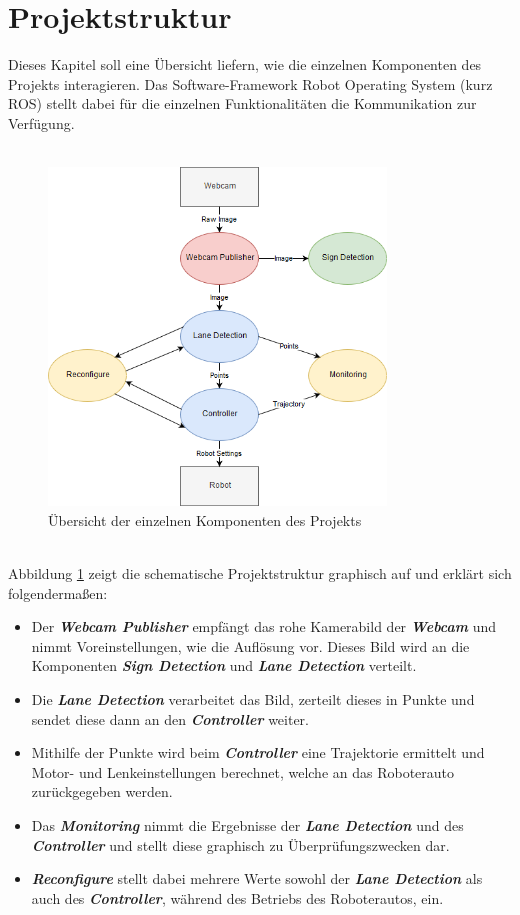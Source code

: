 \section{Projektstruktur}
\label{sec:projektstruktur}
Dieses Kapitel soll eine \"Ubersicht liefern, wie die einzelnen Komponenten des Projekts interagieren. Das Software-Framework Robot Operating System\cite{ROS} (kurz ROS) stellt dabei f\"ur die einzelnen Funktionalit\"aten die Kommunikation zur Verf\"ugung. \\\\
\begin{figure}[h]
	\centering
	\includegraphics[width = 0.8\textwidth]{images/Projektaufbau.png}
	\caption{\"Ubersicht der einzelnen Komponenten des Projekts}
	\label{fig:projektaufbau}
\end{figure}
\\
Abbildung \ref{fig:projektaufbau} zeigt die schematische Projektstruktur graphisch auf und erkl\"art sich folgenderma\ss{}en:
\begin{itemize}
\item Der \textbf{\textit{Webcam Publisher}} empf\"angt das rohe Kamerabild der \textbf{\textit{Webcam}} und nimmt Voreinstellungen, wie die Aufl\"osung vor. Dieses Bild wird an die Komponenten \textbf{\textit{Sign Detection}} und \textbf{\textit{Lane Detection}} verteilt.
\item Die \textbf{\textit{Lane Detection}} verarbeitet das Bild, zerteilt dieses in Punkte und sendet diese dann an den \textbf{\textit{Controller}} weiter.
\item Mithilfe der Punkte wird beim \textbf{\textit{Controller}} eine Trajektorie ermittelt und Motor- und Lenkeinstellungen berechnet, welche an das Roboterauto zur\"uckgegeben werden.
\item Das \textbf{\textit{Monitoring}} nimmt die Ergebnisse der \textbf{\textit{Lane Detection}} und des \textbf{\textit{Controller}} und stellt diese graphisch zu \"Uberpr\"ufungszwecken dar.
\item \textbf{\textit{Reconfigure}} stellt dabei mehrere Werte sowohl der \textbf{\textit{Lane Detection}} als auch des \textbf{\textit{Controller}}, w\"ahrend des Betriebs des Roboterautos, ein.
\end{itemize}